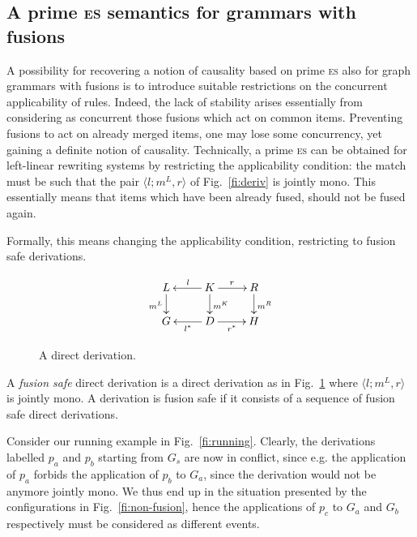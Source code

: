 \documentclass[conference]{IEEEtran}
\newcommand{\esabbr}{\textsc{es}}
\begin{document}
\subsection{A prime {\esabbr} semantics for grammars with fusions}
\label{ss:prime-gg}

A possibility for recovering a notion of causality based on prime
{\esabbr} also for graph grammars with fusions is to
introduce suitable restrictions on the concurrent applicability of
rules.
%
Indeed, the lack of stability arises essentially from
considering as concurrent those fusions which act on common items.
Preventing fusions to act on already merged items, one may lose some
concurrency, yet gaining a definite notion of causality.
%
Technically, a prime {\esabbr} can be obtained for left-linear
rewriting systems by restricting the applicability condition: the
match must be such that the pair $\langle l; m^L, r \rangle$ of
Fig.~\ref{fi:deriv} is jointly mono. This essentially means that items
which have been already fused, should not be fused again.

Formally, this means changing the applicability condition, restricting
to fusion safe derivations.
 
\begin{figure}[t]
\[
\xymatrix@R=6mm{ 
  {L} \ar[d]_{m^L} & {K} \ar[l]_{l} \ar[r]^{r} 
  \ar[d]^{m^K} & {R} \ar[d]^{m^R}\\
  {G} & {D} \ar[l]^{l^*} \ar[r]_{r^*} & {H} }
\]
\caption{A direct derivation.}
\label{fi:deriv-jointly}
\end{figure}


\begin{definition}
  A \emph{fusion safe} direct derivation is a direct derivation as in
  Fig.~\ref{fi:deriv-jointly} where $\langle l; m^L, r \rangle$ is
  jointly mono. A derivation is fusion safe if it consists of a
  sequence of fusion safe direct derivations.
\end{definition}

Consider our running example in Fig.~\ref{fi:running}.
Clearly, the derivations labelled $p_a$ and $p_b$ starting from 
$G_s$ are now in conflict, since e.g. the application of $p_a$ 
forbids the application of $p_b$ to $G_a$, since the 
derivation would not be anymore jointly mono.
%
We thus end up in the situation presented by the configurations
in Fig.~\ref{fi:non-fusion}, 
hence the applications of $p_c$ to $G_a$ and $G_b$ respectively 
must be considered as different events.
\end{document}
